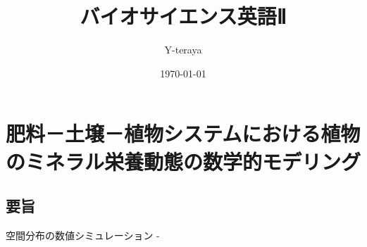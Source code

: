 \documentclass[a4paper,11pt]{ltjsarticle}
\title{\textbf{バイオサイエンス英語Ⅱ}}
\author{Y-teraya}
\date{\today}
\begin{document}
\pagestyle{fancy}
\rhead{\textbf{\thepage}}
\lhead{}
\cfoot{}
\renewcommand{\footrulewidth}{0.4pt}

\maketitle

\section{肥料－土壌－植物システムにおける植物のミネラル栄養動態の数学的モデリング}

\subsection{要旨}

空間分布の数値シミュレーション - 
\end{document}
